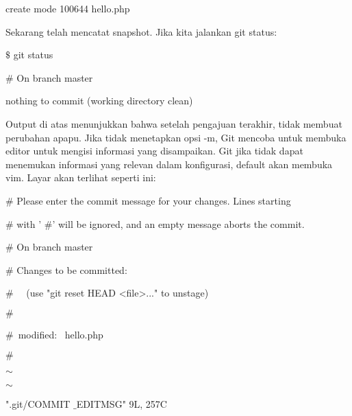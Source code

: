 {\fontsize{10pt}{10pt}\selectfont  create mode 100644 hello.php} \par
\noindent 
{\fontsize{10pt}{10pt}\selectfont  } \par
\noindent 
\vspace{12pt}
\noindent 
Sekarang telah mencatat snapshot. Jika kita jalankan git status:  \par
\noindent 
{\fontsize{10pt}{10pt}\selectfont  $  \$  $ git status} \par
\noindent 
{\fontsize{10pt}{10pt}\selectfont  $  \#  $ On branch master} \par
\noindent 
{\fontsize{10pt}{10pt}\selectfont nothing to commit (working directory clean)} \par
\vspace{12pt}
Output di atas menunjukkan bahwa setelah pengajuan terakhir, tidak membuat perubahan apapu. Jika tidak menetapkan opsi -m, Git mencoba untuk membuka editor untuk mengisi informasi yang disampaikan. Git jika tidak dapat menemukan informasi yang relevan dalam konfigurasi, default akan membuka vim. Layar akan terlihat seperti ini:  \par
\noindent 
{\fontsize{10pt}{10pt}\selectfont  $  \#  $ Please enter the commit message for your changes. Lines starting} \par
\noindent 
{\fontsize{10pt}{10pt}\selectfont  $  \#  $ with ' $  \#  $' will be ignored, and an empty message aborts the commit.} \par
\noindent 
{\fontsize{10pt}{10pt}\selectfont  $  \#  $ On branch master} \par
\noindent 
{\fontsize{10pt}{10pt}\selectfont  $  \#  $ Changes to be committed:} \par
\noindent 
{\fontsize{10pt}{10pt}\selectfont  $  \#  $~~ (use "git reset HEAD <file>..." to unstage)} \par
\noindent 
{\fontsize{10pt}{10pt}\selectfont  $  \#  $} \par
\noindent 
{\fontsize{10pt}{10pt}\selectfont  $  \#  $~modified:~  hello.php} \par
\noindent 
{\fontsize{10pt}{10pt}\selectfont  $  \#  $} \par
\noindent 
{\fontsize{10pt}{10pt}\selectfont  $  \sim  $} \par
\noindent 
{\fontsize{10pt}{10pt}\selectfont  $  \sim  $} \par
\noindent 
{\fontsize{10pt}{10pt}\selectfont ".git/COMMIT $  \_  $EDITMSG" 9L, 257C} \par
\vspace{12pt}
